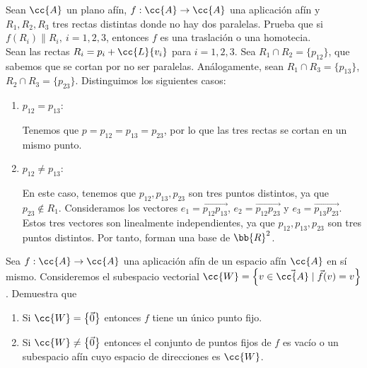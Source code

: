 \begin{ejercicio}
    Sean $\cc{A}$ un plano afín, $f : \cc{A} \to \cc{A}$ una aplicación afín y ${R}_1, {R}_2, {R}_3$ tres rectas distintas donde no hay dos paralelas. Prueba que si $f(R_i) \| R_i,~i = 1, 2, 3$, entonces $f$ es una traslación o una homotecia.\\

    Sean las rectas $R_i=p_i+\cc{L}\{v_i\}$ para $i=1,2,3$.
    Sea $R_1\cap R_2 = \{p_{12}\}$, que sabemos que se cortan por no ser paralelas. Análogamente, sean $R_1\cap R_3 = \{p_{13}\}$, $R_2\cap R_3 = \{p_{23}\}$. Distinguimos los siguientes casos:
    \begin{enumerate}
        \item $p_{12}=p_{13}$:
        
        Tenemos que $p=p_{12}=p_{13}=p_{23}$, por lo que las tres rectas se cortan en un mismo punto.

        \item $p_{12} \neq p_{13}$:
        
        En este caso, tenemos que $p_{12}, p_{13}, p_{23}$ son tres puntos distintos, ya que $p_{23}\notin R_1$.
        Consideramos los vectores $e_1=\vec{p_{12}p_{13}}$, $e_2=\vec{p_{12}p_{23}}$ y $e_3=\vec{p_{13}p_{23}}$. Estos tres vectores son linealmente independientes, ya que $p_{12}, p_{13}, p_{23}$ son tres puntos distintos. Por tanto, forman una base de $\bb{R}^2$.

        
    \end{enumerate}
\end{ejercicio}

\begin{ejercicio}
    Sea $f : \cc{A} \to \cc{A}$ una aplicación afín de un espacio afín  $\cc{A}$ en sí mismo. Consideremos el subespacio vectorial $\cc{W} = \left\{v \in \vec{\cc{A}} \mid \vec{f}(v) = v\right\}$. Demuestra que
    \begin{enumerate}
        \item Si $\cc{W} = \left\{\vec{0}\right\}$ entonces $f$ tiene un único punto fijo.
        
        \item Si $\cc{W} \neq \left\{\vec{0}\right\}$ entonces el conjunto de puntos fijos de $f$ es vacío o un subespacio afín cuyo espacio de direcciones es $\cc{W}$.
    \end{enumerate}
\end{ejercicio}

